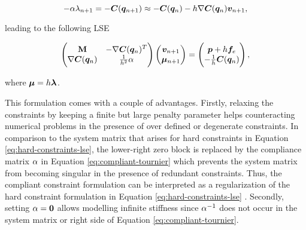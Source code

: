 \[
    -\mathbf{\alpha\lambda}_{n+1} = -\bm{C}(\bm{q}_{n+1}) \approx -\bm{C}(\bm{q}_n) - h\nabla \bm{C}(\bm{q}_n) \bm{v}_{n+1},
\]

\noindent leading to the following LSE \cite{tournier2015}

\begin{equation}\label{eq:compliant-tournier}
\begin{pmatrix}
    \mathbf{M} & -\nabla \bm{C}(\bm{q}_n)^T \\
    \nabla \bm{C}(\bm{q}_n) & \frac{1}{h^2}\mathbf{\alpha}
\end{pmatrix}
\begin{pmatrix}
    \bm{v}_{n+1} \\
    \bm{\mu}_{n+1}
\end{pmatrix}
=
\begin{pmatrix}
    \bm{p} + h\bm{f}_e \\
    - \frac{1}{h}\bm{C}(\bm{q}_n)
\end{pmatrix},
\end{equation}

\noindent where $\bm{\mu} = h\bm{\lambda}$.

This formulation comes with a couple of advantages. Firstly, relaxing the constraints by keeping a finite but large penalty parameter helps
counteracting numerical problems in the presence of over defined or degenerate constraints. In comparison to the system matrix that arises
for hard constraints in Equation \ref{eq:hard-constraints-lse}, the lower-right zero block is replaced by the compliance matrix $\mathbf{\alpha}$ in 
Equation \ref{eq:compliant-tournier} which prevents the system matrix from becoming singular in the presence of redundant constraints. Thus, the 
compliant constraint formulation can be interpreted as a regularization of the hard constraint formulation in Equation \ref{eq:hard-constraints-lse} 
\cite{tournier2015}. Secondly, setting $\mathbf{\alpha} = \mathbf{0}$ allows modelling infinite stiffness since $\mathbf{\alpha}^{-1}$ does not occur in
the system matrix or right side of Equation \ref{eq:compliant-tournier}. 
